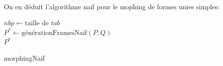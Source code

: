 \paragraph{} On en déduit l'algorithme naif pour le mophing de formes unies simples:\\[0.5cm]

\begin{algorithm}[H]
    \SetAlgoLined
    
    $nbp \gets \text{taille de } tab$\\
    $P^* \gets \text{générationFramesNaif}(P,Q)$\\
    \Return $P^*$
    
    \caption{morphingNaif}
\end{algorithm}
\newpage
